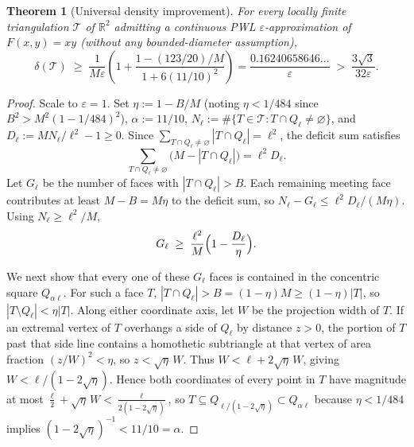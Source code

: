 \documentclass[11pt]{article}
\theoremstyle{plain}
\newtheorem{theorem}{Theorem}
\theoremstyle{definition}
\theoremstyle{remark}
\begin{document}
\begin{theorem}[Universal density improvement]\label{thm:universal}
For every locally finite triangulation $\mathcal{T}$ of $\mathbb{R}^2$ admitting a continuous PWL $\varepsilon$-approximation of $F(x,y) = xy$ (without any bounded-diameter assumption),
\[
\delta(\mathcal{T})
\;\ge\; \frac{1}{M\varepsilon}\left(1 + \frac{1 - (123/20)/M}{1 + 6(11/10)^2}\right)
= \frac{0.16240658646\ldots}{\varepsilon}
\;>\; \frac{3\sqrt{3}}{32\varepsilon}.
\]
\end{theorem}

\begin{proof}
Scale to $\varepsilon = 1$. Set $\eta := 1 - B/M$ (noting $\eta < 1/484$ since $B^2 > M^2(1 - 1/484)^2$), $\alpha := 11/10$, $N_\ell := \#\{T \in \mathcal{T} : T \cap Q_\ell \neq \varnothing\}$, and $D_\ell := M N_\ell / \ell^2 - 1 \ge 0$.
Since $\sum_{T \cap Q_\ell \neq \varnothing} |T \cap Q_\ell| = \ell^2$, the deficit sum satisfies
\[
\sum_{T \cap Q_\ell \neq \varnothing} \bigl(M - |T \cap Q_\ell|\bigr) = \ell^2 D_\ell.
\]
Let $G_\ell$ be the number of faces with $|T \cap Q_\ell| > B$. Each remaining meeting face contributes at least $M - B = M\eta$ to the deficit sum, so $N_\ell - G_\ell \le \ell^2 D_\ell / (M\eta)$. Using $N_\ell \ge \ell^2 / M$,
\[
G_\ell \;\ge\; \frac{\ell^2}{M}\Bigl(1 - \frac{D_\ell}{\eta}\Bigr).
\]

We next show that every one of these $G_\ell$ faces is contained in the concentric square $Q_{\alpha\ell}$.
For such a face $T$, $|T \cap Q_\ell| > B = (1-\eta)M \ge (1-\eta)|T|$, so $|T \setminus Q_\ell| < \eta |T|$.
Along either coordinate axis, let $W$ be the projection width of $T$.
If an extremal vertex of $T$ overhangs a side of $Q_\ell$ by distance $z > 0$, the portion of $T$ past that side line contains a homothetic subtriangle at that vertex of area fraction $(z/W)^2 < \eta$, so $z < \sqrt{\eta}\,W$.
Thus $W < \ell + 2\sqrt{\eta}\,W$, giving $W < \ell / (1 - 2\sqrt{\eta})$.
Hence both coordinates of every point in $T$ have magnitude at most $\frac{\ell}{2} + \sqrt{\eta}\,W < \frac{\ell}{2(1 - 2\sqrt{\eta})}$, so $T \subseteq Q_{\ell / (1 - 2\sqrt{\eta})} \subset Q_{\alpha\ell}$ because $\eta < 1/484$ implies $(1 - 2\sqrt{\eta})^{-1} < 11/10 = \alpha$.


\end{proof}
\end{document}
